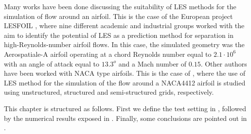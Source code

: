 Many works have been done discussing the suitability of LES methods for the simulation of flow around an airfoil. This is the case of the European project LESFOIL \cite{davidson_lesfoil:_2012}, where nine different academic and industrial groups worked with the aim to identify the potential of LES as a prediction method for separation in high-Reynolds-number airfoil flows. In this case, the simulated geometry was the Aerospatiale-A airfoil operating at a chord Reynolds number equal to $2.1\cdot10^6$ with an angle of attack equal to $13.3^o$ and a Mach number of $0.15$. Other authors have been worked with NACA type airfoils. This is the case of \cite{jansen_stabilized_1999, kaltenbach_large-eddy_1995, schmidt_assessment_????}, where the use of LES method for the simulation of the flow around a NACA4412 airfoil is studied using unstructured, structured and semi-structured grids, respectively.

This chapter is structured as follows. First we define the test setting in , followed by the numerical results exposed in . Finally, some conclusions are pointed out in .

%

